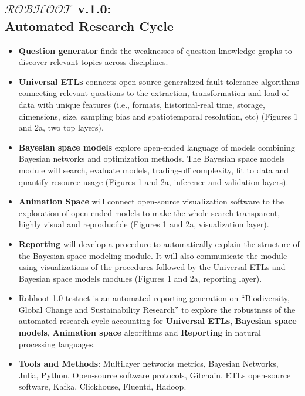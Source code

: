 \documentclass[10pt, a4paper, twocolumn]{article} %
\begin{document}
  \subsection{{\bf $\mathcal{ROBHOOT}$ v.1.0}: \\Automated Research Cycle}
  \begin{itemize}
  \item {\bf Question generator} finds the weaknesses of question
    knowledge graphs to discover relevant topics across disciplines.
  \item {\bf Universal ETLs} connects open-source generalized
    fault-tolerance algorithms connecting relevant questions to the
    extraction, transformation and load of data with unique features
    (i.e., formats, historical-real time, storage, dimensions, size,
    sampling bias and spatiotemporal resolution, etc) (Figures 1 and
    2a, two top layers).
   \item {\bf Bayesian space models} explore open-ended language of
     models combining Bayesian networks and optimization methods. The
     Bayesian space models module will search, evaluate models,
     trading-off complexity, fit to data and quantify resource usage
     (Figures 1 and 2a, inference and validation layers). 
   \item {\bf Animation Space} will connect open-source visualization
     software to the exploration of open-ended models to make the
     whole search transparent, highly visual and reproducible (Figures
     1 and 2a, visualization layer).
   \item {\bf Reporting} will develop a procedure to automatically
     explain the structure of the Bayesian space modeling module. It
     will also communicate the module using visualizations of the
     procedures followed by the Universal ETLs and Bayesian space
     models modules (Figures 1 and 2a, reporting layer).
   \item Robhoot 1.0 testnet is an automated reporting generation on
     ``Biodiversity, Global Change and Sustainability Research'' to
     explore the robustness of the automated research cycle accounting
     for {\bf Universal ETLs}, {\bf Bayesian space models}, {\bf
       Animation space} algorithms and {\bf Reporting} in natural
     processing languages.
   \end{itemize}

   \begin{itemize}
   \item {\bf Tools and Methods}: Multilayer networks metrics,
     Bayesian Networks, Julia, Python, Open-source software protocols,
     Gitchain, ETLs open-source software, Kafka, Clickhouse, Fluentd,
     Hadoop.
   \end{itemize}
\end{document}
